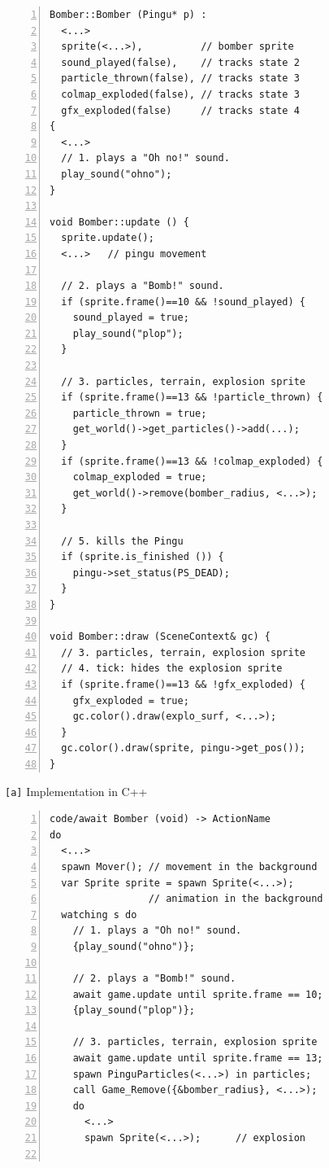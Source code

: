 \documentclass{vgtc}                          %
\newcommand{\code}[1] {{\small{\texttt{#1}}}}
\newcommand{\ax}{\code{[a]}\xspace}
\begin{document}
\begin{figure}[th!]
\begin{minipage}[t]{0.50\linewidth}
\begin{lstlisting}[numbers=left,xleftmargin=3em]
Bomber::Bomber (Pingu* p) :
  <...>
  sprite(<...>),          // bomber sprite
  sound_played(false),    // tracks state 2
  particle_thrown(false), // tracks state 3
  colmap_exploded(false), // tracks state 3
  gfx_exploded(false)     // tracks state 4
{
  <...>
  // 1. plays a "Oh no!" sound.
  play_sound("ohno");
}

void Bomber::update () {
  sprite.update();
  <...>   // pingu movement

  // 2. plays a "Bomb!" sound.
  if (sprite.frame()==10 && !sound_played) {
    sound_played = true;
    play_sound("plop");
  }

  // 3. particles, terrain, explosion sprite
  if (sprite.frame()==13 && !particle_thrown) {
    particle_thrown = true;
    get_world()->get_particles()->add(...);
  }
  if (sprite.frame()==13 && !colmap_exploded) {
    colmap_exploded = true;
    get_world()->remove(bomber_radius, <...>);
  }

  // 5. kills the Pingu
  if (sprite.is_finished ()) {
    pingu->set_status(PS_DEAD);
  }
}

void Bomber::draw (SceneContext& gc) {
  // 3. particles, terrain, explosion sprite
  // 4. tick: hides the explosion sprite
  if (sprite.frame()==13 && !gfx_exploded) {
    gfx_exploded = true;
    gc.color().draw(explo_surf, <...>);
  }
  gc.color().draw(sprite, pingu->get_pos());
}
\end{lstlisting}
\centering\small{\ax Implementation in C++}
\end{minipage}
%
\begin{minipage}[t]{0.50\linewidth}
\begin{lstlisting}[numbers=left,xleftmargin=3em]
code/await Bomber (void) -> ActionName
do
  <...>
  spawn Mover(); // movement in the background
  var Sprite sprite = spawn Sprite(<...>);
                 // animation in the background
  watching s do
    // 1. plays a "Oh no!" sound.
    {play_sound("ohno")};

    // 2. plays a "Bomb!" sound.
    await game.update until sprite.frame == 10;
    {play_sound("plop")};

    // 3. particles, terrain, explosion sprite
    await game.update until sprite.frame == 13;
    spawn PinguParticles(<...>) in particles;
    call Game_Remove({&bomber_radius}, <...>);
    do
      <...>
      spawn Sprite(<...>);      // explosion


\end{lstlisting}
\end{minipage}
\end{figure}
\end{document}
